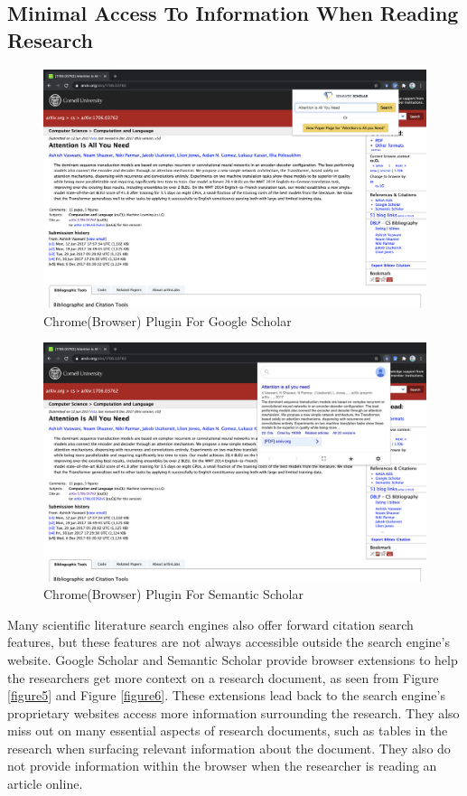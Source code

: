 \subsection{Minimal Access To Information When Reading Research}
\begin{figure}[h]
    \centering
    \includegraphics[width=\maxwidth{\textwidth}]{src/images/gg-plugin.png}
    \caption{Chrome(Browser) Plugin For Google Scholar}
    \label{figure\arabic{figurecounter}}
\end{figure}
\begin{figure}[h]
    \centering
    \includegraphics[width=\maxwidth{\textwidth}]{src/images/ss-plugin.png}
    \caption{Chrome(Browser) Plugin For Semantic Scholar}
    \label{figure\arabic{figurecounter}}
\end{figure}
Many scientific literature search engines also offer forward citation search features, but these features are not always accessible outside the search engine’s website. 
Google Scholar and Semantic Scholar provide browser extensions to help the researchers get more context on a research document, as seen from Figure \ref{figure5} and Figure \ref{figure6}. 
These extensions lead back to the search engine's proprietary websites access more information surrounding the research. 
They also miss out on many essential aspects of research documents, such as tables in the research when surfacing relevant information about the document. 
They also do not provide information within the browser when the researcher is reading an article online. 
\pagebreak
